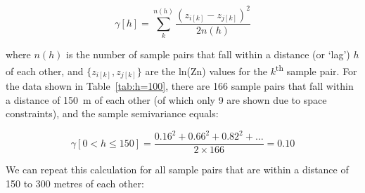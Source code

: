 \begin{equation}
\gamma[h] = \sum\limits_{k}^{n(h)}\frac{(z_{i[k]}-z_{j[k]})^2}{2 n(h)}
\end{equation}

\noindent where $n(h)$ is the number of sample pairs that fall within
a distance (or `lag') $h$ of each other, and $\{z_{i[k]},z_{j[k]}\}$
are the ln(Zn) values for the $k$\textsuperscript{th} sample pair.
For the data shown in Table~\ref{tab:h=100}, there are 166 sample
pairs that fall within a distance of 150~m of each other (of which
only 9 are shown due to space constraints), and the sample
semivariance equals:

\[
\gamma[0<h\leq{150}] =
\frac{0.16^2 + 0.66^2 + 0.82^2 + \ldots}{2 \times 166} = 0.10
\]

We can repeat this calculation for all sample pairs that are within a
distance of 150 to 300 metres of each other:

